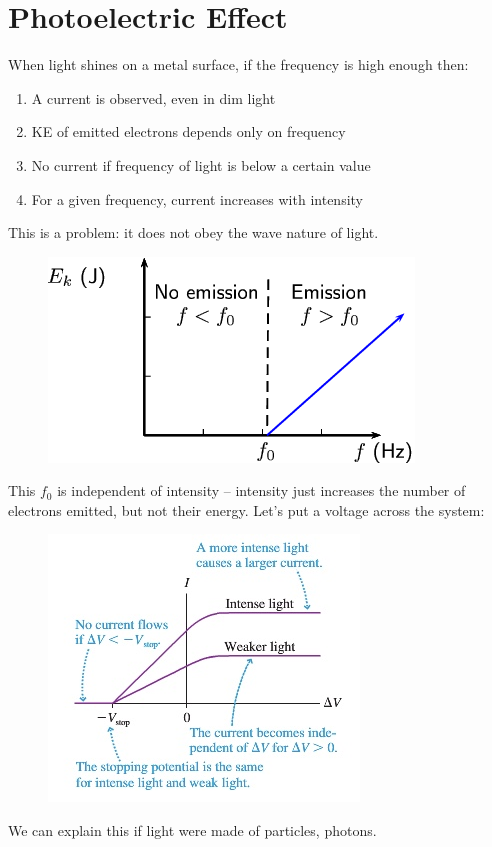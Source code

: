 \documentclass[a4paper, 11pt, normalem]{report}
\begin{document}
\section{Photoelectric Effect}
When light shines on a metal surface, if the frequency is high enough then:
\begin{enumerate}
    \item A current is observed, even in dim light
    \item KE of emitted electrons depends only on frequency
    \item No current if frequency of light is below a certain value
    \item For a given frequency, current increases with intensity
\end{enumerate}
This is a problem: it does not obey the wave nature of light.
\begin{figure}[H]
    \centering
    \includegraphics[scale=0.7]{Photoelec.png}
\end{figure}
This $f_{0}$ is independent of intensity -- intensity just increases the number of electrons emitted, but not their energy.
Let's put a voltage across the system: 
\begin{figure}[H]
    \centering
    \includegraphics{currentvsvoltage.jpg}
\end{figure}
We can explain this if light were made of particles, photons.
\end{document}
